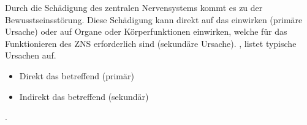 {%
Durch die Schädigung des zentralen Nervensystems kommt es zu
der Bewusstseinsstörung. 
Diese Schädigung kann direkt auf
das  einwirken (primäre Ursache) oder auf Organe oder 
Körperfunktionen einwirken, welche für das Funktionieren des ZNS 
erforderlich sind (sekundäre
Ursache). 
,
listet typische Ursachen auf.


}
{
\begin{itemize}
  \item Direkt das  betreffend (primär)
  \item Indirekt das  betreffend (sekundär)
\end{itemize}

.
}{}{}{}

